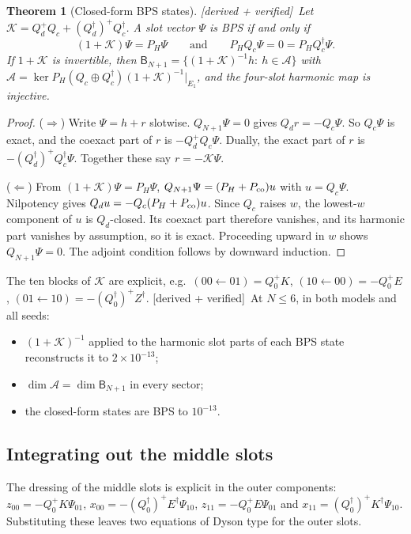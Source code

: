 \documentclass[11pt]{article}
\newcommand{\B}{\mathsf B}
\newcommand{\PH}{P_{\!H}}
\newcommand{\Kc}{\mathcal K}
\newcommand{\tagbox}[2]{\textsf{\small\color{#1}[#2]}}
\newcommand{\VER}{\tagbox{cder}{derived + verified}}
\theoremstyle{plain}
\newtheorem{theorem}{Theorem}
\theoremstyle{remark}
\numberwithin{equation}{section}
\begin{document}
\begin{theorem}[Closed-form BPS states]\label{thm:C}\VER\
Let $\Kc=Q_d^+Q_c+(Q_d^\dagger)^+Q_c^\dagger$. A slot vector $\Psi$ is BPS if and only if
\begin{equation}\label{eq:cf}
(1+\Kc)\Psi=\PH\Psi\qquad\text{and}\qquad \PH Q_c\Psi=0=\PH Q_c^\dagger\Psi .
\end{equation}
If $1+\Kc$ is invertible, then $\B_{N+1}=\{(1+\Kc)^{-1}h:\ h\in\mathcal A\}$ with
$\mathcal A=\ker\PH(Q_c\oplus Q_c^\dagger)(1+\Kc)^{-1}|_{E_1}$, and the four-slot harmonic map is injective.
\end{theorem}
\begin{proof}
($\Rightarrow$) Write $\Psi=h+r$ slotwise. $Q_{N+1}\Psi=0$ gives $Q_dr=-Q_c\Psi$. So $Q_c\Psi$ is exact, and the
coexact part of $r$ is $-Q_d^+Q_c\Psi$. Dually, the exact part of $r$ is $-(Q_d^\dagger)^+Q_c^\dagger\Psi$. Together
these say $r=-\Kc\Psi$.

($\Leftarrow$) From $(1+\Kc)\Psi=\PH\Psi$, $Q_{N+1}\Psi=(P_H+P_{\rm co})u$ with $u=Q_c\Psi$. Nilpotency gives
$Q_du=-Q_c(P_H+P_{\rm co})u$. Since $Q_c$ raises $w$, the lowest-$w$ component of $u$ is $Q_d$-closed. Its coexact part
therefore vanishes, and its harmonic part vanishes by assumption, so it is exact. Proceeding upward in $w$ shows
$Q_{N+1}\Psi=0$. The adjoint condition follows by downward induction.
\end{proof}

The ten blocks of $\Kc$ are explicit, e.g.\ $(00\leftarrow01)=Q_0^+K$, $(10\leftarrow00)=-Q_0^+E$,
$(01\leftarrow10)=-(Q_0^\dagger)^+Z^\dagger$. \VER\ At $N\le6$, in both models and all seeds:
\begin{itemize}\itemsep1pt
\item $(1+\Kc)^{-1}$ applied to the harmonic slot parts of each BPS state reconstructs it to $2\times10^{-13}$;
\item $\dim\mathcal A=\dim\B_{N+1}$ in every sector;
\item the closed-form states are BPS to $10^{-13}$.
\end{itemize}

\subsection{Integrating out the middle slots}

The dressing of the middle slots is explicit in the outer components:
$z_{00}=-Q_0^+K\Psi_{01}$, $x_{00}=-(Q_0^\dagger)^+E^\dagger\Psi_{10}$, $z_{11}=-Q_0^+E\Psi_{01}$ and
$x_{11}=(Q_0^\dagger)^+K^\dagger\Psi_{10}$. Substituting these leaves two equations of Dyson type for the outer slots.
\end{document}
